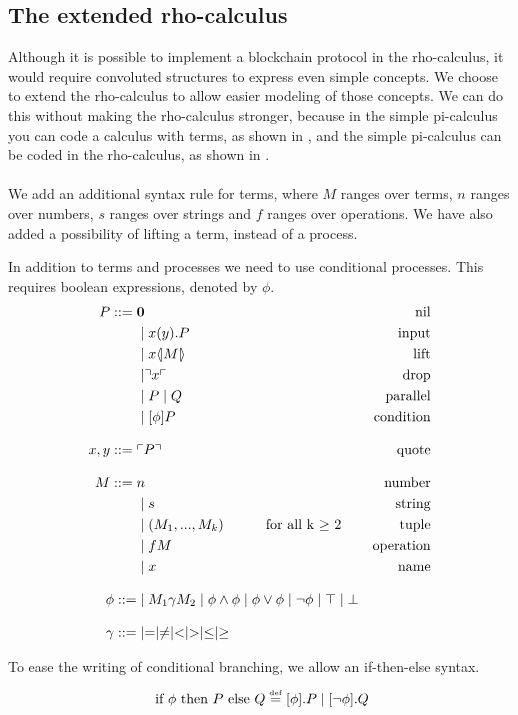 

\subsection{The extended rho-calculus} \label{sec:addsyntax}
Although it is possible to implement a blockchain protocol in the rho-calculus, it would require convoluted structures to express even simple concepts.
We choose to extend the rho-calculus to allow easier modeling of those concepts.
We can do this without making the rho-calculus stronger, because in the simple pi-calculus you can code a calculus with terms, as shown in \citep{Baldamus2005}, and the simple pi-calculus can be coded in the rho-calculus, as shown in \citep{Meredith2005}.\\
\\
We add an additional syntax rule for terms, where $M$ ranges over terms, $n$ ranges over numbers, $s$ ranges over strings and $f$ ranges over operations. We have also added a possibility of lifting a term, instead of a process.

In addition to terms and processes we need to use conditional processes. This requires boolean expressions, denoted by \ensuremath{\phi}.
\begin{align*}
P  ::= \; &  \mathbf{0} & \text{nil} \\
      & \mid x(y).P & \text{input} \\
	  & \mid x \langle \! | M | \! \rangle&\text{lift}\\
      & \mid \urcorner x \ulcorner & \text{drop} \\
      & \mid P \mid Q & \text{parallel} \\
      & \mid [\phi] P & \text{condition} \\[3mm]
    x,y ::= \; & \ulcorner P \urcorner & \text{quote}\\[3mm]
M::=\; & n &\text{number}\\
 	  &\mid s &\text{string}\\
 	  &\mid (M_1,...,M_k)\quad\quad\quad \text{for all k $\geq$ 2} &\text{tuple}\\
 	  &\mid fM &\text{operation}\\
 	  &\mid x &\text{name}\\[3mm]
\phi ::=& \mid M_1\gamma M_2 \mid \phi\land\phi \mid \phi\lor\phi \mid \neg\phi \mid \top \mid \bot\\[3mm]
\gamma ::=& \mid = \mid \neq \mid < \mid > \mid \leq \mid \geq
\end{align*}

To ease the writing of conditional branching, we allow an if-then-else syntax.
\begin{align*}
	\text{ if }\phi\text{ then }P\text{ else }Q \overset{\underset{\mathrm{def}}{}}{=} [\phi].P \mid [\neg \phi].Q
\end{align*}


